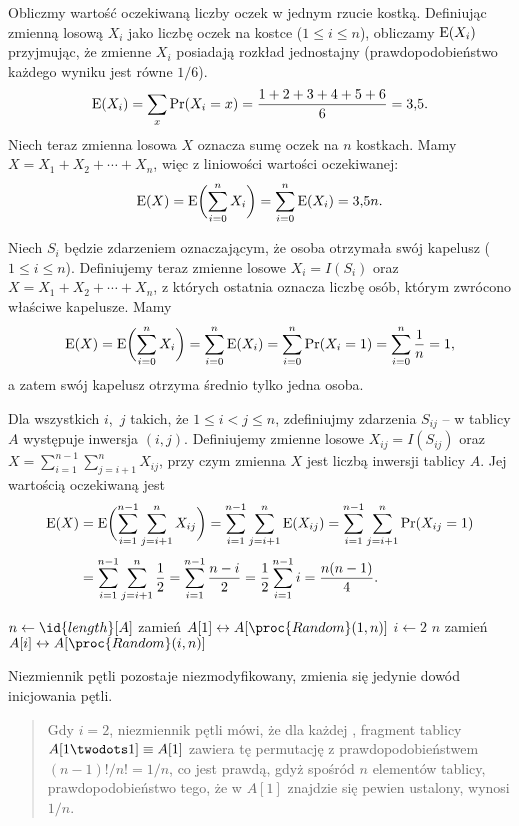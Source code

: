 \exercise{} %
Obliczmy wartość oczekiwaną liczby oczek w jednym rzucie kostką. Definiując zmienną losową $X_i$ jako liczbę oczek na  kostce ($1\le i\le n$), obliczamy $\operatorname{E}(X_i)$ przyjmując, że zmienne $X_i$ posiadają rozkład jednostajny (prawdopodobieństwo każdego wyniku jest równe $1/6$).
\[
	\operatorname{E}(X_i) = \sum_x\Pr(X_i=x) = \frac{1+2+3+4+5+6}{6} = 3{,}5.
\]
Niech teraz zmienna losowa $X$ oznacza sumę oczek na $n$ kostkach. Mamy $X=X_1+X_2+\cdots+X_n$, więc z liniowości wartości oczekiwanej:
\[
	\operatorname{E}(X) = \operatorname{E}\biggl(\sum_{i=0}^nX_i\biggr) = \sum_{i=0}^n\operatorname{E}(X_i) = 3{,}5n.
\]

\exercise{} %
Niech $S_i$ będzie zdarzeniem oznaczającym, że  osoba otrzymała swój kapelusz ($1\le i\le n$). Definiujemy teraz zmienne losowe $X_i=I(S_i)$ oraz $X=X_1+X_2+\cdots+X_n$, z których ostatnia oznacza liczbę osób, którym zwrócono właściwe kapelusze. Mamy
\[
	\operatorname{E}(X) = \operatorname{E}\biggl(\sum_{i=0}^nX_i\biggr) = \sum_{i=0}^n\operatorname{E}(X_i) = \sum_{i=0}^n\Pr(X_i=1) = \sum_{i=0}^n\frac{1}{n} = 1,
\]
a zatem swój kapelusz otrzyma średnio tylko jedna osoba.

\exercise{} %
Dla wszystkich $i$,~$j$ takich, że $1\le i<j\le n$, zdefiniujmy zdarzenia $S_{ij}$ -- w tablicy $A$ występuje inwersja $(i,j)$. Definiujemy zmienne losowe $X_{ij}=I(S_{ij})$ oraz $X=\sum_{i=1}^{n-1}\sum_{j=i+1}^nX_{ij}$, przy czym zmienna $X$ jest liczbą inwersji tablicy $A$. Jej wartością oczekiwaną jest
\begin{align*}
	\operatorname{E}(X) &= \operatorname{E}\biggl(\sum_{i=1}^{n-1}\sum_{j=i+1}^nX_{ij}\biggr) = \sum_{i=1}^{n-1}\sum_{j=i+1}^n\operatorname{E}(X_{ij}) = \sum_{i=1}^{n-1}\sum_{j=i+1}^n\Pr(X_{ij}=1) \\[1mm]
	&= \sum_{i=1}^{n-1}\sum_{j=i+1}^n\frac{1}{2} = \sum_{i=1}^{n-1}\frac{n-i}{2} = \frac{1}{2}\sum_{i=1}^{n-1}i = \frac{n(n-1)}{4}.
\end{align*}


\exercise{} %
\begin{codebox}
\li	$n\gets\id{length}[A]$
\li	zamień $A[1]\leftrightarrow A[\proc{Random}(1,n)]$
\li	\For $i\gets2$ \To $n$
\li		\Do
			zamień $A[i]\leftrightarrow A[\proc{Random}(i,n)]$
		\End
\end{codebox}
Niezmiennik pętli pozostaje niezmodyfikowany, zmienia się jedynie dowód inicjowania pętli.
\begin{quote}
	Gdy $i=2$, niezmiennik pętli mówi, że dla każdej , fragment tablicy $A[1\twodots1]\equiv A[1]$ zawiera tę permutację z prawdopodobieństwem $(n-1)!/n!=1/n$, co jest prawdą, gdyż spośród $n$ elementów tablicy, prawdopodobieństwo tego, że w $A[1]$ znajdzie się pewien ustalony, wynosi $1/n$.
\end{quote}

